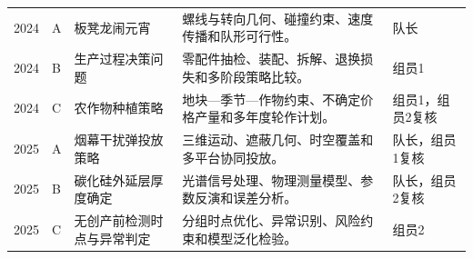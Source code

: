 \begin{longtable}{p{1.2cm}p{1.3cm}p{3.3cm}p{6.0cm}p{1.9cm}}
2024 & A & 板凳龙闹元宵 & 螺线与转向几何、碰撞约束、速度传播和队形可行性。 & 队长\\
2024 & B & 生产过程决策问题 & 零配件抽检、装配、拆解、退换损失和多阶段策略比较。 & 组员1\\
2024 & C & 农作物种植策略 & 地块—季节—作物约束、不确定价格产量和多年度轮作计划。 & 组员1，组员2复核\\
2025 & A & 烟幕干扰弹投放策略 & 三维运动、遮蔽几何、时空覆盖和多平台协同投放。 & 队长，组员1复核\\
2025 & B & 碳化硅外延层厚度确定 & 光谱信号处理、物理测量模型、参数反演和误差分析。 & 队长，组员2复核\\
2025 & C & 无创产前检测时点与异常判定 & 分组时点优化、异常识别、风险约束和模型泛化检验。 & 组员2\\
\bottomrule
\end{longtable}

